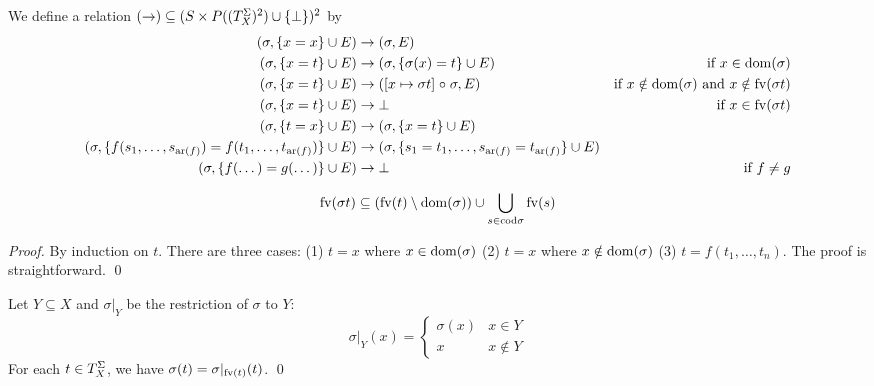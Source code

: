 \documentclass[draft]{llncs}
\begin{document}
\begin{mydefinition}\label{def:unification}
	We define a relation $({\to}) \subseteq (S \times P((T^{\Sigma}_{X})^2) \cup \{ \bot \})^2$ by
	\begin{align}
		(\sigma, \{ x = x \} \cup E) &\to (\sigma, E) \label{eq:unification_trivial} \\
		(\sigma, \{ x = t \} \cup E) &\to (\sigma, \{ \sigma(x) = t \} \cup E) & \text{if $x \in \mathrm{dom}(\sigma)$} \label{eq:unification_lazy_subst} \\
		(\sigma, \{ x = t \} \cup E) &\to ([x \mapsto \sigma t] \mathrel{\circ} \sigma, E) & \text{if $x \notin \mathrm{dom}(\sigma)$ and $x \notin \mathrm{fv}({\sigma t})$} \label{eq:unification_update_sigma} \\
		(\sigma, \{ x = t \} \cup E) &\to \bot & \text{if $x \in \mathrm{fv}({\sigma t})$} \label{eq:unification_circular} \\
		(\sigma, \{ t = x \} \cup E) &\to (\sigma, \{ x = t \} \cup E) \label{eq:unification_swap} \\
		(\sigma, \{ f(s_1, \dots, s_{\mathrm{ar}({f})}) = f(t_1, \dots, t_{\mathrm{ar}({f})}) \} \cup E) &\to (\sigma, \{ s_1 = t_1, \dots, s_{\mathrm{ar}({f})} = t_{\mathrm{ar}({f})} \} \cup E) \label{eq:unification_same_operation} \\
		(\sigma, \{ f(\dots) = g(\dots) \} \cup E) &\to \bot & \text{if $f \neq g$} \label{eq:unification_different_operation}
	\end{align}
\end{mydefinition}

\begin{mylemma}
	\[ \mathrm{fv}({\sigma t}) \subseteq (\mathrm{fv}({t}) \setminus \mathrm{dom}(\sigma)) \cup \bigcup_{s \in \mathrm{cod}{\sigma}} \mathrm{fv}({s}) \]
\end{mylemma}
\begin{proof}
	By induction on $t$.
	There are three cases: (1) $t = x$ where $x \in \mathrm{dom}(\sigma)$ (2) $t = x$ where $x \notin \mathrm{dom}(\sigma)$ (3) $t = f(t_1, \dots, t_n)$.
	The proof is straightforward.
	\qed
\end{proof}

\begin{mylemma}
	Let $Y \subseteq X$ and $\sigma|_{Y}$ be the restriction of $\sigma$ to $Y$:
	\[ \sigma|_{Y}(x) = \begin{cases}
		\sigma(x) & x \in Y \\
		x & x \notin Y
	\end{cases} \]
	For each $t \in T^{\Sigma}_{X}$, we have $\sigma(t) = \sigma|_{\mathrm{fv}({t})} (t)$.
	\qed
\end{mylemma}
\end{document}
